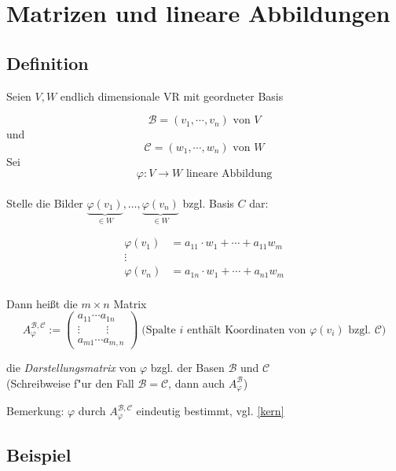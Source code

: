  
 
 
\section{Matrizen und lineare Abbildungen}

\subsection{Definition}

Seien $V,W$ endlich dimensionale VR mit geordneter Basis

\[\mathcal{B} = (v_1,\cdots,v_n) \text{ von } V\] und
\[\mathcal{C} = (w_1,\cdots,w_n) \text{ von } W\] Sei
\[\varphi:V\rightarrow W \text{ lineare Abbildung}\]
\\
Stelle die Bilder $\underbrace{\varphi(v_1)}_{\in W}, \ldots, \underbrace{\varphi(v_n)}_{\in W}$ bzgl. Basis $C$ dar:

\begin{align*}
\varphi(v_1) &= a_{11} \cdot w_1 + \cdots + a_{11}w_m\\
\vdots\\
\varphi(v_n) &= a_{1n} \cdot w_1 + \cdots + a_{n1}w_m\\
\end{align*}

Dann heißt die $m\times n$ Matrix
\[\left. A_\varphi^{\mathcal{B},\mathcal{C}} :=
\begin{pmatrix}
a_{11} \cdots a_{1n}\\
\vdots \hspace{1cm} \vdots\\
a_{m1}\cdots a_{m,n}
\end{pmatrix}\right. \;\text{(Spalte $i$ enthält Koordinaten von $\varphi(v_i)$ bzgl. $\mathcal{C}$)}\]

die \emph{Darstellungsmatrix} von $\varphi$ bzgl. der Basen $\mathcal{B}$ und $\mathcal{C}$ \\(Schreibweise f"ur den Fall $\mathcal{B} =
\mathcal{C}$, dann auch  $A_\varphi^\mathcal{B}$)

Bemerkung: $\varphi$ durch $A_\varphi^{\mathcal{B},\mathcal{C}}$ eindeutig bestimmt, vgl. \ref{kern}

\subsection{Beispiel}


